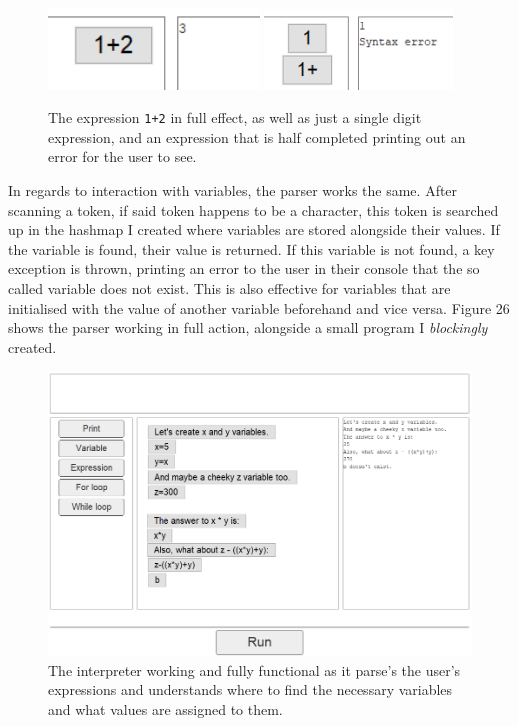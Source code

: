 \documentclass[a4paper, 12pt]{article}
\begin{document}
            \begin{figure}[h]
                \centering
                \includegraphics[width=56mm]{1+2.png}
                \includegraphics[width=50mm]{1+.png}
                \caption{The expression \texttt{1+2} in full effect, as well as just a single digit
                expression, and an expression that is half completed printing out an error for the
                user to see.}
            \end{figure}

            \clearpage
            In regards to interaction with variables, the parser works the same. After scanning a
            token, if said token happens to be a character, this token is searched up in the hashmap
            I created where variables are stored alongside their values. If the variable is found,
            their value is returned. If this variable is not found, a key exception is thrown,
            printing an error to the user in their console that the so called variable does not exist.
            This is also effective for variables that are initialised with the value of another variable
            beforehand and vice versa. Figure 26 shows the parser working in full action, alongside
            a small program I \textit{blockingly} created.

            \begin{figure}[h]
                \centering
                \includegraphics[width=170mm]{working_interpreter.png}
                \caption{The interpreter working and fully functional as it parse's the user's
                expressions and understands where to find the necessary variables and
                what values are assigned to them.}
            \end{figure}
\end{document}
